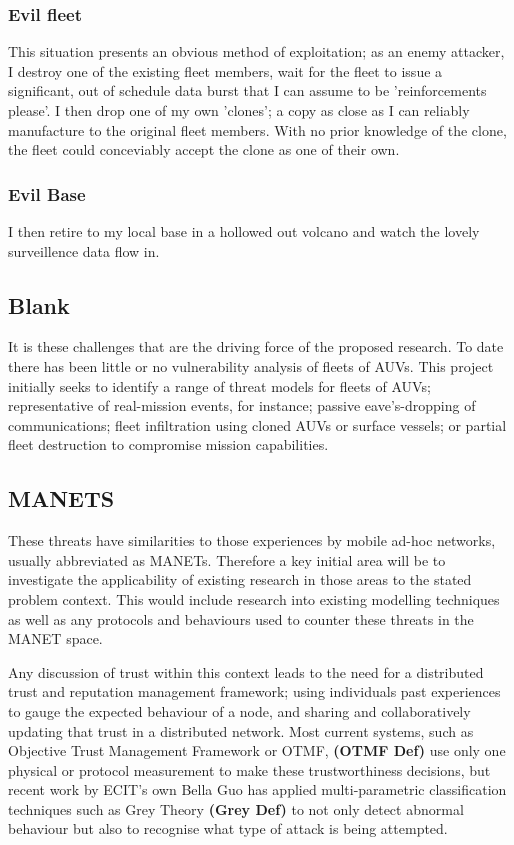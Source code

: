 \documentclass[oneside,11pt,a4paper]{Latex/Classes/PhDthesisPSnPDF}
\begin{document}
\begin{doublespace}
\subsubsection{Evil fleet}  This situation presents an obvious method of
exploitation; as an enemy attacker, I destroy one of the existing fleet members,
wait for the fleet to issue a significant, out of schedule data burst that I can
assume to be 'reinforcements please'. I then drop one of my own 'clones'; a copy
as close as I can reliably manufacture to the original fleet members. With no
prior knowledge of the clone, the fleet could conceviably accept the clone as
one of their own. 

\subsubsection{Evil Base} I then retire to my local base in a hollowed out
volcano and watch the lovely surveillence data flow in.

\subsection{Blank}
It is these challenges that are the driving force of the proposed research. To
date there has been little or no vulnerability analysis of fleets of AUVs. This
project initially seeks to identify a range of threat models for fleets of
AUVs; representative of real-mission events, for instance; passive
eave's-dropping of communications; fleet infiltration using cloned AUVs or
surface vessels; or partial fleet destruction to compromise mission
capabilities.

\subsection{MANETS}  These threats have similarities to those experiences by
mobile ad-hoc networks, usually abbreviated as MANETs. Therefore
a key initial area will be to investigate the applicability of existing research
in those areas to the stated problem context. This would include research into
existing modelling techniques as well as any protocols and behaviours used to
counter these threats in the MANET space.

Any discussion of trust within this context leads to the need for a distributed
trust and reputation management framework; using individuals past experiences to
gauge the expected behaviour of a node, and sharing and collaboratively updating
that trust in a distributed network. Most current systems, such as Objective
Trust Management Framework or OTMF, \textbf{(OTMF Def)} use only one physical or
protocol measurement to make these trustworthiness decisions, but recent work 
by ECIT's own Bella Guo has applied multi-parametric classification techniques
such as Grey Theory \textbf{(Grey Def)} to not only detect abnormal behaviour
but also to recognise what type of attack is being attempted.


\end{doublespace}
\end{document}
